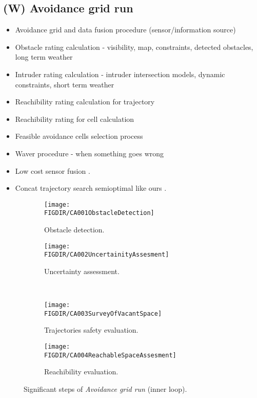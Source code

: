 \subsection{(W) Avoidance grid run}\label{s:aviudabceGridRun}

\begin{itemize}
    \item Avoidance grid and data fusion procedure (sensor/information source)
    \item Obstacle rating calculation - visibility, map, constraints, detected obstacles, long term weather
    \item Intruder rating calculation - intruder intersection models, dynamic constraints, short term weather
    \item Reachibility rating calculation for trajectory
    \item Reachibility rating for cell calculation
    \item Feasible avoidance cells selection process
    \item Waver procedure - when something goes wrong
	\item Low cost sensor fusion \cite{sabatini2013low}.
	\item Concat trajectory search semioptimal like ours \cite{shaw1998using}.
\end{itemize}

\begin{figure}[H]
\centering
    \begin{subfigure}{0.48\textwidth}
        \texttt{[image: \\FIGDIR/CA001ObstacleDetection]}
        \caption{Obstacle detection.}
        \label{fig:obstacleDetectionAvoidanceGrid}
    \end{subfigure}
    \begin{subfigure}{0.48\textwidth}
        \texttt{[image: \\FIGDIR/CA002UncertainityAssesment]} 
        \caption{Uncertainty assessment.}
        \label{fig:uncertainityAssesmentAvoidanceGrid}
    \end{subfigure}
    \\
    \begin{subfigure}{0.48\textwidth}
        \texttt{[image: \\FIGDIR/CA003SurveyOfVacantSpace]} 
        \caption{Trajectories safety evaluation.}
        \label{fig:trajectoriesSafetyEvaluationAvoidanceGrid}
    \end{subfigure}
    \begin{subfigure}{0.48\textwidth}
        \texttt{[image: \\FIGDIR/CA004ReachableSpaceAssesment]} 
        \caption{Reachibility evaluation.}
        \label{fig:reachibilityAssessmentAvoidanceGrid}
    \end{subfigure}
    \caption{Significant steps of \emph{Avoidance grid run} (inner loop).}
    \label{fig:significantStepsofAvoidanceGridRun}
\end{figure}


